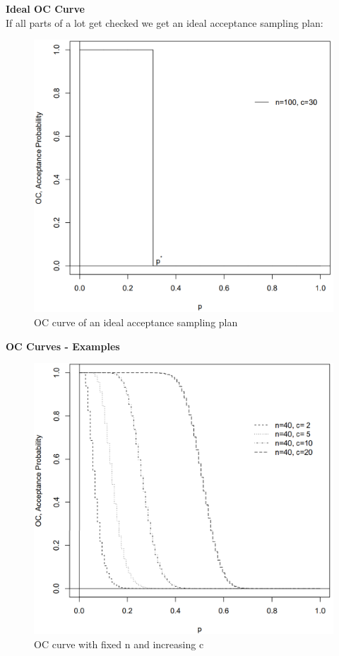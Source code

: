 \textbf{Ideal OC Curve}\\
If all parts of a lot get checked we get an ideal acceptance sampling plan:
\begin{figure}[H]
  \centering
  \includegraphics[width=0.8\linewidth]{Pics/5.1.1.png}
  \caption{OC curve of an ideal acceptance sampling plan}
\end{figure}

\textbf{OC Curves - Examples}
\begin{figure}[H]
  \centering

  \includegraphics[width=0.8\linewidth]{Pics/5.1.2.png}
  \caption{OC curve with fixed n and increasing c}
\end{figure}

